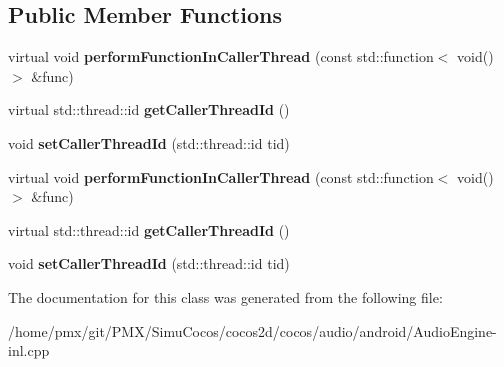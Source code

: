 \subsection*{Public Member Functions}
\begin{DoxyCompactItemize}
\item 
\mbox{\label{classCallerThreadUtils_a915726c00570d7b64d51be83b50357a6}} 
virtual void {\bfseries perform\+Function\+In\+Caller\+Thread} (const std\+::function$<$ void()$>$ \&func)
\item 
\mbox{\label{classCallerThreadUtils_a6c6af9418a951cd7c17da692de015cb9}} 
virtual std\+::thread\+::id {\bfseries get\+Caller\+Thread\+Id} ()
\item 
\mbox{\label{classCallerThreadUtils_ab4b2aefb3261427e9a77586dfc9c671d}} 
void {\bfseries set\+Caller\+Thread\+Id} (std\+::thread\+::id tid)
\item 
\mbox{\label{classCallerThreadUtils_a915726c00570d7b64d51be83b50357a6}} 
virtual void {\bfseries perform\+Function\+In\+Caller\+Thread} (const std\+::function$<$ void()$>$ \&func)
\item 
\mbox{\label{classCallerThreadUtils_a6c6af9418a951cd7c17da692de015cb9}} 
virtual std\+::thread\+::id {\bfseries get\+Caller\+Thread\+Id} ()
\item 
\mbox{\label{classCallerThreadUtils_ab4b2aefb3261427e9a77586dfc9c671d}} 
void {\bfseries set\+Caller\+Thread\+Id} (std\+::thread\+::id tid)
\end{DoxyCompactItemize}


The documentation for this class was generated from the following file\+:\begin{DoxyCompactItemize}
\item 
/home/pmx/git/\+P\+M\+X/\+Simu\+Cocos/cocos2d/cocos/audio/android/Audio\+Engine-\/inl.\+cpp\end{DoxyCompactItemize}
